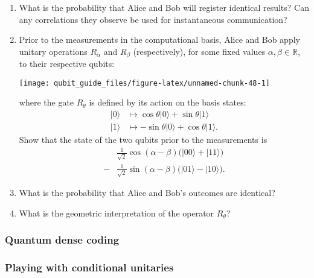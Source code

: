 \documentclass[fleqn]{article}
\begin{document}
\begin{enumerate}
\def\labelenumi{\arabic{enumi}.}
\item
  What is the probability that Alice and Bob will register identical results?
  Can any correlations they observe be used for instantaneous communication?
\item
  Prior to the measurements in the computational basis, Alice and Bob apply unitary operations \(R_\alpha\) and \(R_\beta\) (respectively), for some fixed values \(\alpha,\beta\in\mathbb{R}\), to their respective qubits:

  \begin{center}\texttt{[image: qubit\_guide\_files/figure-latex/unnamed-chunk-48-1]} \end{center}

  where the gate \(R_\theta\) is defined by its action on the basis states:
  \[
     \begin{aligned}
       |0\rangle
       &\longmapsto
       \cos\theta|0\rangle + \sin\theta|1\rangle
     \\|1\rangle
       &\longmapsto
       -\sin\theta|0\rangle + \cos\theta|1\rangle.
     \end{aligned}
   \]
  Show that the state of the two qubits prior to the measurements is
  \[
     \begin{aligned}
       &\frac{1}{\sqrt{2}}\cos(\alpha-\beta)\big( |00\rangle + |11\rangle \big)
     \\- &\frac{1}{\sqrt{2}}\sin(\alpha-\beta)\big( |01\rangle - |10\rangle \big).
     \end{aligned}
   \]
\item
  What is the probability that Alice and Bob's outcomes are identical?
\item
  What is the geometric interpretation of the operator \(R_\theta\)?
\end{enumerate}

\hypertarget{quantum-dense-coding}{%
\subsubsection{Quantum dense coding}\label{quantum-dense-coding}}

\hypertarget{playing-with-conditional-unitaries}{%
\subsubsection{Playing with conditional unitaries}\label{playing-with-conditional-unitaries}}
\end{document}
